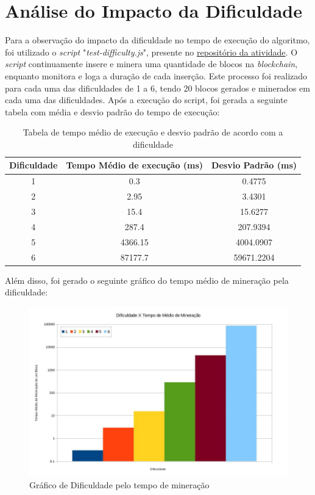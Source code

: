 \documentclass{article}
\begin{document}
\section{Análise do Impacto da Dificuldade}
Para a observação do impacto da dificuldade no tempo de execução do algoritmo, foi utilizado o \textit{script} "\textit{test-difficulty.js}", presente no \href{https://github.com/caioasmuniz/local-blockchain}{repositório da atividade}. O \textit{script} continuamente insere e minera uma quantidade de blocos na \textit{blockchain}, enquanto monitora e loga a duração de cada inserção. Este processo foi realizado para cada uma das dificuldades de 1 a 6, tendo 20 blocos gerados e minerados em cada uma das dificuldades. Após a execução do script, foi gerada a seguinte tabela com média e desvio padrão do tempo de execução:
\begin{table}[h]
  \begin{tabular}{| c | c | c |}
    \hline
    Dificuldade & Tempo Médio de execução (ms) & Desvio Padrão (ms) \\
    \hline
    1           & 0.3                          & 0.4775             \\
    \hline
    2           & 2.95                         & 3.4301             \\
    \hline
    3           & 15.4                         & 15.6277            \\
    \hline
    4           & 287.4                        & 207.9394           \\
    \hline
    5           & 4366.15                      & 4004.0907          \\
    \hline
    6           & 87177.7                      & 59671.2204         \\
    \hline
  \end{tabular}
  \caption{Tabela de tempo médio de execução e desvio padrão de acordo com a dificuldade}
\end{table}

Além disso, foi gerado o seguinte gráfico do tempo médio de mineração pela dificuldade:
\begin{figure}[h!]
  \includegraphics[width=\textwidth]{difficulty-graph.jpg}
\caption{Gráfico de Dificuldade pelo tempo de mineração}
\end{figure}
\end{document}

